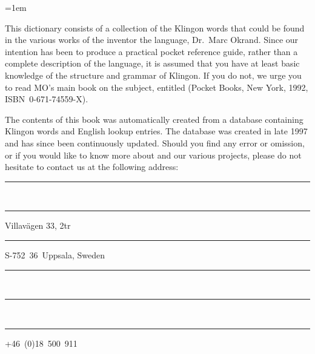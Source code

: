 %
%
%


\parindent=1em                                  %

\raggedbottom
{}

\noindent This dictionary consists of a collection of the Klingon
words that could be found in the various works of the inventor the
language, Dr.\ Marc Okrand. Since our intention has been to produce a
practical pocket reference guide, rather than a complete description
of the language, it is assumed that you have at least basic knowledge
of the structure and grammar of Klingon. If you do not, we urge you to
read MO's main book on the subject, entitled  (Pocket Books, New York, 1992, ISBN~0-671-74559-X).

The contents of this book was automatically created from a database
containing \fromkliwords{} Klingon words and \tokliwords{} English
lookup entries. The database was created in late 1997 and has since
been continuously updated. Should you find any error or omission, or
if you would like to know more about 
and our various projects, please do not hesitate to contact us at the
following address:


\vspace{3mm}%
\noindent\parbox[t]{.5\textwidth}{%
  \rule{1.25cm}{0mm}\\
  \rule{1.25cm}{0mm}Villavägen 33, 2tr\\
  \rule{1.25cm}{0mm}S-752~36~Uppsala, Sweden%
}%
\parbox[t]{.5\textwidth}{%
  \rule{1.75cm}{0mm}\\
  \rule{1.75cm}{0mm}\\
  \rule{1.75cm}{0mm}+46~(0)18~500~911%
}


